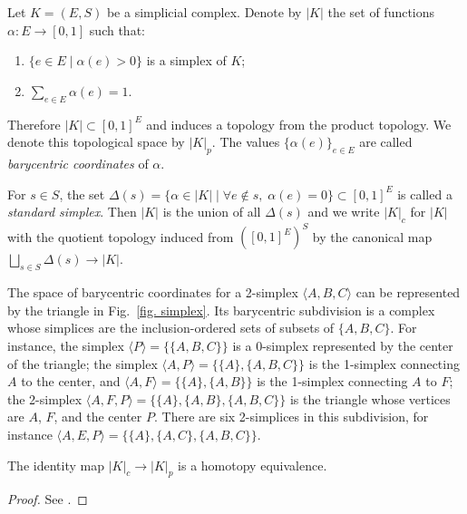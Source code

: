 \documentclass[english,letterpaper]{article}%
\numberwithin{equation}{section}
\numberwithin{figure}{section}
\numberwithin{table}{section}
\theoremstyle{definition}
\theoremstyle{definition}
\theoremstyle{definition}
\theoremstyle{plain}
\theoremstyle{plain}
\theoremstyle{plain}
\theoremstyle{plain}
\theoremstyle{remark}
\theoremstyle{remark}
\begin{document}
\begin{defn}
    Let $K=(E,S)$ be a simplicial complex. Denote by $|K|$ the set of functions $\alpha:E\to [0,1]$ such that:
    \begin{enumerate}
        \item $\{e\in E\mid\alpha(e)>0\}$ is a simplex of $K$;
        \item $\sum_{e\in E}\alpha(e)=1$.
    \end{enumerate}
    Therefore $|K|\subset [0,1]^E$ and induces a topology from the product topology. We denote this topological space by $|K|_p$. The values $\{\alpha(e)\}_{e\in E}$ are called \emph{barycentric coordinates} of $\alpha$.
    
    For $s\in S$, the set $\Delta(s)=\{\alpha\in |K|\mid \forall e\notin s,\; \alpha(e)=0\}\subset [0,1]^E$ is called a \emph{standard simplex}. Then $|K|$ is the union of all $\Delta(s)$ and we write $|K|_c$ for $|K|$ with the quotient topology induced from $\left([0,1]^E\right)^S$ by the canonical map $\bigsqcup_{s\in S}\Delta(s)\to |K|$.
\end{defn}

\begin{example}
    The space of barycentric coordinates for a 2-simplex $\langle A,B,C\rangle$ can be represented by the triangle in Fig.~\ref{fig. simplex}. Its barycentric subdivision is a complex whose simplices are the inclusion-ordered sets of subsets of $\{A,B,C\}$. For instance, the simplex $\langle P\rangle=\{\{A,B,C\}\}$ is a $0$-simplex represented by the center of the triangle; the simplex $\langle A,P\rangle=\{\{A\},\{A,B,C\}\}$ is the 1-simplex connecting $A$ to the center, and $\langle A,F\rangle=\{\{A\},\{A,B\}\}$ is the 1-simplex connecting $A$ to $F$; the 2-simplex $\langle A,F,P \rangle=\{\{A\},\{A,B\},\{A,B,C\}\}$ is the triangle whose vertices are $A$, $F$, and the center $P$. There are six 2-simplices in this subdivision, for instance $\langle A,E,P\rangle=\{\{A\},\{A,C\},\{A,B,C\}\}$.
\end{example}


\begin{prop}
    The identity map $|K|_c\to |K|_p$ is a homotopy equivalence.
\end{prop}
\begin{proof}
    See \cite[Prop. 8.1.4 and 13.2.2]{tomDieck}.
\end{proof}
\end{document}
